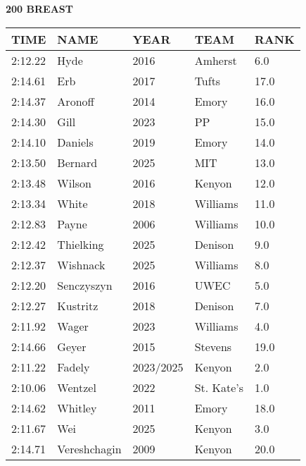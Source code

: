 \begin{minipage}[t]{0.48\textwidth}
\centering
\textbf{200 BREAST}\\[0.05cm]
\begin{tabular}{@{}p{1.8cm}p{2.8cm}p{1.2cm}p{1.4cm}p{0.8cm}@{}}
\hline
\textbf{TIME} & \textbf{NAME} & \textbf{YEAR} & \textbf{TEAM} & \textbf{RANK} \\
\hline
2:12.22 & Hyde & 2016 & Amherst & 6.0 \\
2:14.61 & Erb & 2017 & Tufts & 17.0 \\
2:14.37 & Aronoff & 2014 & Emory & 16.0 \\
2:14.30 & Gill & 2023 & PP & 15.0 \\
2:14.10 & Daniels & 2019 & Emory & 14.0 \\
2:13.50 & Bernard & 2025 & MIT & 13.0 \\
2:13.48 & Wilson & 2016 & Kenyon & 12.0 \\
2:13.34 & White & 2018 & Williams & 11.0 \\
2:12.83 & Payne & 2006 & Williams & 10.0 \\
2:12.42 & Thielking & 2025 & Denison & 9.0 \\
2:12.37 & Wishnack & 2025 & Williams & 8.0 \\
2:12.20 & Senczyszyn & 2016 & UWEC & 5.0 \\
2:12.27 & Kustritz & 2018 & Denison & 7.0 \\
2:11.92 & Wager & 2023 & Williams & 4.0 \\
2:14.66 & Geyer & 2015 & Stevens & 19.0 \\
2:11.22 & Fadely & 2023/2025 & Kenyon & 2.0 \\
2:10.06 & Wentzel & 2022 & St. Kate's & 1.0 \\
2:14.62 & Whitley & 2011 & Emory & 18.0 \\
2:11.67 & Wei & 2025 & Kenyon & 3.0 \\
2:14.71 & Vereshchagin & 2009 & Kenyon & 20.0 \\
\hline
\end{tabular}
\end{minipage}\hfill
